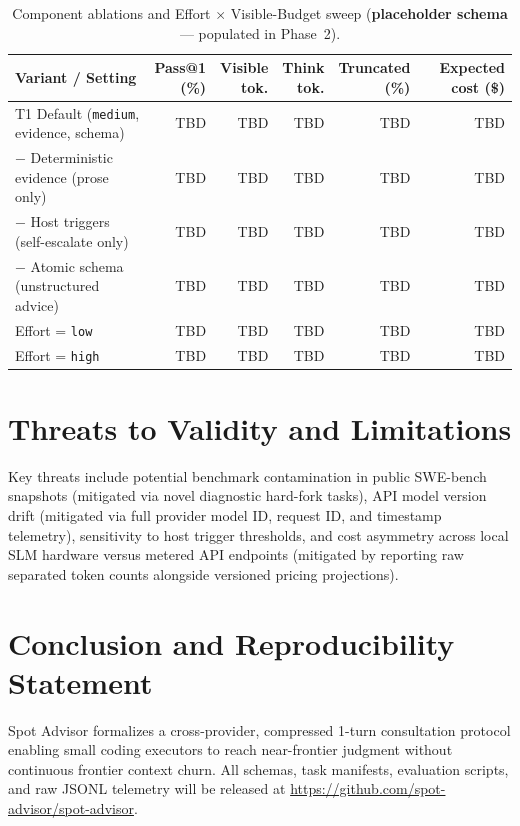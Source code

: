 \documentclass[11pt]{article}
\begin{document}
\begin{table}[t]
\centering
\caption{Component ablations and Effort $\times$ Visible-Budget sweep (\textbf{placeholder schema} --- populated in Phase~2).}
\label{tab:ablations}
\small
\begin{tabularx}{\textwidth}{@{}Xrrrrr@{}}
\toprule
Variant / Setting & \shortstack{Pass@1\\(\%)} & \shortstack{Visible\\tok.} & \shortstack{Think\\tok.} & \shortstack{Truncated\\(\%)} & \shortstack{Expected cost\\(\$)} \\
\midrule
T1 Default (\texttt{medium}, evidence, schema) & TBD & TBD & TBD & TBD & TBD \\
\quad $-$ Deterministic evidence (prose only)      & TBD & TBD & TBD & TBD & TBD \\
\quad $-$ Host triggers (self-escalate only)     & TBD & TBD & TBD & TBD & TBD \\
\quad $-$ Atomic schema (unstructured advice)    & TBD & TBD & TBD & TBD & TBD \\
\quad Effort = \texttt{low}                      & TBD & TBD & TBD & TBD & TBD \\
\quad Effort = \texttt{high}                     & TBD & TBD & TBD & TBD & TBD \\
\bottomrule
\end{tabularx}
\end{table}

\section{Threats to Validity and Limitations}
\label{sec:threats}

Key threats include potential benchmark contamination in public SWE-bench snapshots (mitigated via novel diagnostic hard-fork tasks), API model version drift (mitigated via full provider model ID, request ID, and timestamp telemetry), sensitivity to host trigger thresholds, and cost asymmetry across local SLM hardware versus metered API endpoints (mitigated by reporting raw separated token counts alongside versioned pricing projections).

\section{Conclusion and Reproducibility Statement}
\label{sec:conclusion}

Spot Advisor formalizes a cross-provider, compressed 1-turn consultation protocol enabling small coding executors to reach near-frontier judgment without continuous frontier context churn. All schemas, task manifests, evaluation scripts, and raw JSONL telemetry will be released at \url{https://github.com/spot-advisor/spot-advisor}.



\end{document}
